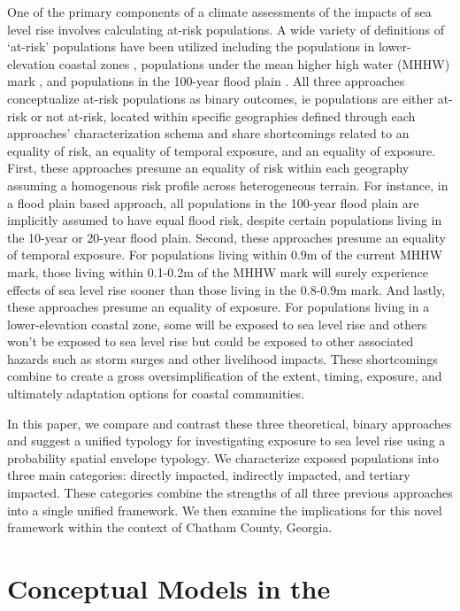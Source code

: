 \documentclass[12pt,]{article}
\begin{document}
One of the primary components of a climate assessments of the impacts of
sea level rise involves calculating at-risk populations. A wide variety
of definitions of `at-risk' populations have been utilized including the
populations in lower-elevation coastal zones
\citep{neumann2015future, mcgranahan2007rising}, populations under the
mean higher high water (MHHW) mark
\citep{hauer2016millions, strauss2015carbon}, and populations in the
100-year flood plain
\citep{nicholls2010sea, brown2018quantifying, hallegatte2011assessing, heberger2011potential}.
All three approaches conceptualize at-risk populations as binary
outcomes, ie populations are either at-risk or not at-risk, located
within specific geographies defined through each approaches'
characterization schema and share shortcomings related to an equality of
risk, an equality of temporal exposure, and an equality of exposure.
First, these approaches presume an equality of risk within each
geography assuming a homogenous risk profile across heterogeneous
terrain. For instance, in a flood plain based approach, all populations
in the 100-year flood plain are implicitly assumed to have equal flood
risk, despite certain populations living in the 10-year or 20-year flood
plain. Second, these approaches presume an equality of temporal
exposure. For populations living within 0.9m of the current MHHW mark,
those living within 0.1-0.2m of the MHHW mark will surely experience
effects of sea level rise sooner than those living in the 0.8-0.9m mark.
And lastly, these approaches presume an equality of exposure. For
populations living in a lower-elevation coastal zone, some will be
exposed to sea level rise and others won't be exposed to sea level rise
but could be exposed to other associated hazards such as storm surges
and other livelihood impacts. These shortcomings combine to create a
gross oversimplification of the extent, timing, exposure, and ultimately
adaptation options for coastal communities.

In this paper, we compare and contrast these three theoretical, binary
approaches and suggest a unified typology for investigating exposure to
sea level rise using a probability spatial envelope typology. We
characterize exposed populations into three main categories: directly
impacted, indirectly impacted, and tertiary impacted. These categories
combine the strengths of all three previous approaches into a single
unified framework. We then examine the implications for this novel
framework within the context of Chatham County, Georgia.

\section{Conceptual Models in the}\label{conceptual-models-in-the}
\end{document}
